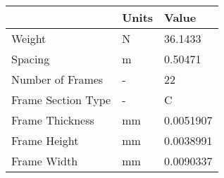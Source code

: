 \begin{tabular}{lll}
& Units & Value \\ 
\hline 
Weight & N & 36.1433 \\ 
Spacing & m & 0.50471 \\ 
Number of Frames & - & 22 \\ 
Frame Section Type & - & C \\ 
Frame Thickness & mm & 0.0051907 \\ 
Frame Height & mm & 0.0038991 \\ 
Frame Width & mm & 0.0090337 \\ 
\hline 
\end{tabular}